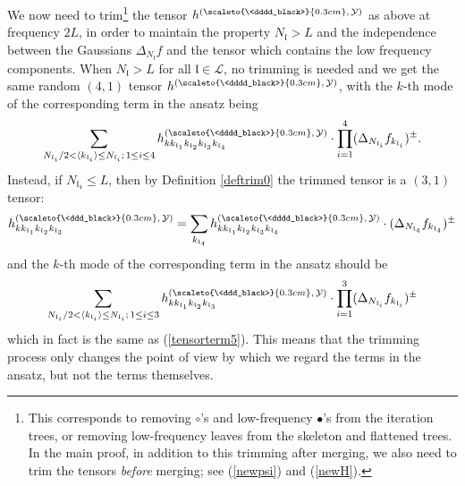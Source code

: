 \documentclass[11 pt,reqno]{amsart}
\theoremstyle{definition}
\theoremstyle{remark}
\numberwithin{equation}{section}
\newcommand{\Lc}{\mathcal{L}}
\newcommand{\Yc}{\mathcal{Y}}
\newcommand{\lf}{\mathfrak{l}}
\begin{document}
{We now need to trim\footnote{This corresponds to removing $\circ$'s and low-frequency $\bullet$'s from the iteration trees, or removing low-frequency leaves from the skeleton and flattened trees. In the main proof, in addition to this trimming after merging, we also need to trim the tensors \emph{before} merging; see (\ref{newpsi}) and (\ref{newH}).} the tensor $h^{(\scaleto{\<dddd_black>}{0.3cm},\,\Yc)}$ as above at frequency $2L$, in order to maintain the property $N_\lf>L$ and the independence between the Gaussians $\Delta_{N_\lf} f$ and the tensor which contains the low frequency components. When $N_\lf >L$ for all $\lf \in \Lc$, no trimming is needed and we get the same random $(4,1)$ tensor $h^{(\scaleto{\<dddd_black>}{0.3cm},\,\Yc)}$, with the $k$-th mode of the corresponding term in the ansatz being \begin{equation}\label{tensorterm5}
\sum_{N_{\lf_i}/2<\langle k_{\lf_i}\rangle\leq N_{\lf_i};\,1\leq i\leq 4} h^{(\scaleto{\<dddd_black>}{0.3cm},\,\Yc)}_{kk_{\lf_1}k_{\lf_2}k_{\lf_3}k_{\lf_4}}\cdot \prod_{i=1}^4 (\Delta_{N_{\lf_i}}f_{k_{\lf_i}})^\pm.
\end{equation}
Instead, if $N_{\lf_4} \leq L$, then by Definition \ref{deftrim0} the trimmed tensor is a $(3,1)$ tensor:
\begin{equation}
h^{(\scaleto{\<ddd_black>}{0.3cm},\,\Yc)}_{kk_{\lf_1}k_{\lf_2}k_{\lf_3}} = \sum_{k_{\lf_4}} h^{(\scaleto{\<dddd_black>}{0.3cm},\,\Yc)}_{kk_{\lf_1}k_{\lf_2}k_{\lf_3}k_{\lf_4}}\cdot  (\Delta_{N_{\lf_4}}f_{k_{\lf_4}})^\pm
\end{equation} and the 
$k$-th mode of the corresponding term in the ansatz should be \begin{equation}\label{tensorterm4}
\sum_{N_{\lf_i}/2<\langle k_{\lf_i}\rangle\leq N_{\lf_i};\,1\leq i\leq 3} h^{(\scaleto{\<ddd_black>}{0.3cm},\,\Yc)}_{kk_{\lf_1}k_{\lf_2}k_{\lf_3}}\cdot \prod_{i=1}^3  (\Delta_{N_{\lf_i}}f_{k_{\lf_i}})^\pm
\end{equation} which in fact is the same as (\ref{tensorterm5}). This means that the trimming process only changes the point of view by which we regard the terms in the ansatz, but not the terms themselves.

}
\end{document}
